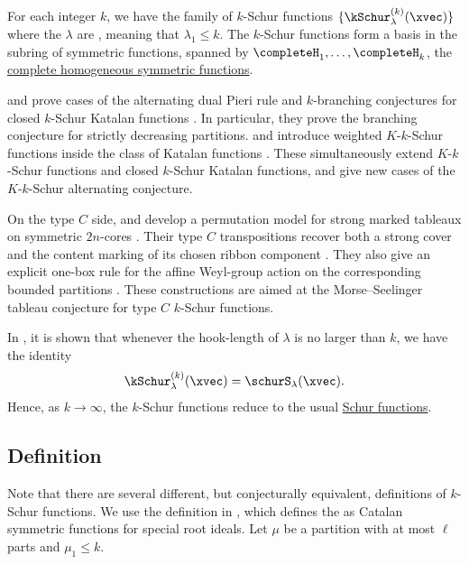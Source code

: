 For each integer $k$, we have the family of $k$-Schur functions $\{ \kSchur^{(k)}_\lambda(\xvec) \}$
where the $\lambda$ are \label{kBoundedPartition},
meaning that $\lambda_1 \leq k$.
The $k$-Schur functions form a basis in the subring of symmetric functions,
spanned by $\completeH_1,\dotsc,\completeH_k$, the \hyperref[completeH]{complete homogeneous symmetric functions}.

 and  prove cases of the alternating dual
Pieri rule and $k$-branching conjectures for closed $k$-Schur Katalan
functions \cite{FangGao2025x}.  In particular, they prove the branching
conjecture for strictly decreasing partitions.
 and  introduce weighted $K$-$k$-Schur
functions inside the class of Katalan functions \cite{FanGao2025x}.  These
simultaneously extend $K$-$k$-Schur functions and closed $k$-Schur Katalan
functions, and give new cases of the $K$-$k$-Schur alternating conjecture.

On the type $C$ side,  and  develop a
permutation model for strong marked tableaux on symmetric $2n$-cores
\cite{FangGao2026x}.  Their type $C$ transpositions recover both a strong
cover and the content marking of its chosen ribbon component
\cite[Thm.~3.16]{FangGao2026x}.  They also give an explicit one-box rule for
the affine Weyl-group action on the corresponding bounded partitions
\cite[Thm.~4.4]{FangGao2026x}.  These constructions are aimed at the
Morse--Seelinger tableau conjecture for type $C$ $k$-Schur functions.

In \cite{LapointeMorse2007}, it is shown that whenever 
the hook-length of $\lambda$ is no larger than $k$, we have the identity
\[
\kSchur^{(k)}_\lambda(\xvec) = \schurS_\lambda(\xvec).
\]
Hence, as $k\to \infty$, the $k$-Schur functions reduce to the usual \hyperref[schurS]{Schur functions}.


\subsection[kSchurDefinition]{Definition}

Note that there are several different, but conjecturally equivalent,
definitions of $k$-Schur functions.
We use the definition in \cite{BlasiakMorsePunSummers2018},
which defines the \label{kSchurFunctionDefinition}
as Catalan symmetric functions for special root ideals.
Let $\mu$ be a partition with at most $\ell$ parts and $\mu_1 \leq k$.

